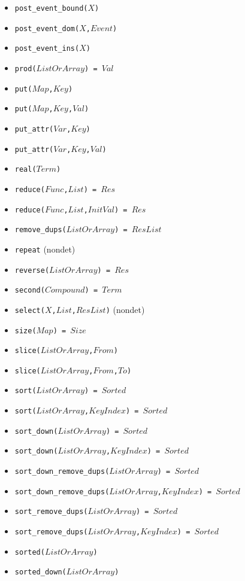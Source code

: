 \documentclass[10pt]{article}
\begin{document}
\begin{multicols}{2}
\begin{scriptsize}
\begin{itemize}
    \item \texttt{post\_event\_bound($X$)}
    \item \texttt{post\_event\_dom($X$,$Event$)}
    \item \texttt{post\_event\_ins($X$)}
    \item \texttt{prod($ListOrArray$) = $Val$}
    \item \texttt{put($Map$,$Key$)}
    \item \texttt{put($Map$,$Key$,$Val$)}
    \item \texttt{put\_attr($Var$,$Key$)}
    \item \texttt{put\_attr($Var$,$Key$,$Val$)}
    \item \texttt{real($Term$)}
    \item \texttt{reduce($Func$,$List$) = $Res$}
    \item \texttt{reduce($Func$,$List$,$InitVal$) = $Res$}
    \item \texttt{remove\_dups($ListOrArray$) = $ResList$}
    \item \texttt{repeat} (nondet)
    \item \texttt{reverse($ListOrArray$) = $Res$}
    \item \texttt{second($Compound$) = $Term$}
    \item \texttt{select($X$,$List$,$ResList$)} (nondet)
    \item \texttt{size($Map$) = $Size$}
    \item \texttt{slice($ListOrArray$,$From$)}
    \item \texttt{slice($ListOrArray$,$From$,$To$)}
    \item \texttt{sort($ListOrArray$) = $Sorted$}
    \item \texttt{sort($ListOrArray$,$KeyIndex$) = $Sorted$}
    \item \texttt{sort\_down($ListOrArray$) = $Sorted$}
    \item \texttt{sort\_down($ListOrArray$,$KeyIndex$) = $Sorted$}
    \item \texttt{sort\_down\_remove\_dups($ListOrArray$) = $Sorted$}
    \item \texttt{sort\_down\_remove\_dups($ListOrArray$,$KeyIndex$) = $Sorted$}
    \item \texttt{sort\_remove\_dups($ListOrArray$) = $Sorted$}
    \item \texttt{sort\_remove\_dups($ListOrArray$,$KeyIndex$) = $Sorted$}
    \item \texttt{sorted($ListOrArray$)}
    \item \texttt{sorted\_down($ListOrArray$)}

\end{itemize}
\end{scriptsize}
\end{multicols}
\end{document}

